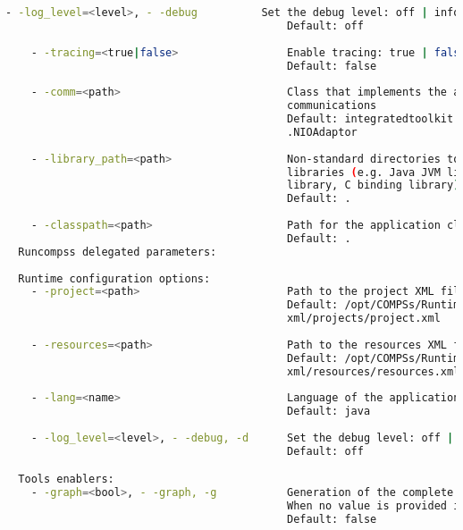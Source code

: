 \begin{lstlisting}[language=bash]
    - -log_level=<level>, - -debug          Set the debug level: off | info | debug
                                            Default: off
                                            
    - -tracing=<true|false>                 Enable tracing: true | false
                                            Default: false
                                            
    - -comm=<path>                          Class that implements the adaptor for 
                                            communications
                                            Default: integratedtoolkit.nio.master
                                            .NIOAdaptor
                                            
    - -library_path=<path>                  Non-standard directories to search for 
                                            libraries (e.g. Java JVM library, Python
                                            library, C binding library) 
                                            Default: .
                                            
    - -classpath=<path>                     Path for the application classes / modules
                                            Default: .
  Runcompss delegated parameters:
                                            
  Runtime configuration options:
    - -project=<path>                       Path to the project XML file
                                            Default: /opt/COMPSs/Runtime/configuration/
                                            xml/projects/project.xml
                                            
    - -resources=<path>                     Path to the resources XML file
                                            Default: /opt/COMPSs/Runtime/configuration/
                                            xml/resources/resources.xml
                                            
    - -lang=<name>                          Language of the application (java/c/python)
                                            Default: java
                                            
    - -log_level=<level>, - -debug, -d      Set the debug level: off | info | debug
                                            Default: off

  Tools enablers:
    - -graph=<bool>, - -graph, -g           Generation of the complete graph (true/false)
                                            When no value is provided it is set to true
                                            Default: false
                                            

\end{lstlisting}

